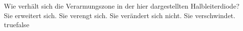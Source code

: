     {Wie verhält sich die Verarmungszone in der hier dargestellten Halbleiterdiode?}
    {Sie erweitert sich.}
    {Sie verengt sich.}
    {Sie verändert sich nicht.}
    {Sie verschwindet. }
    {true}{false}